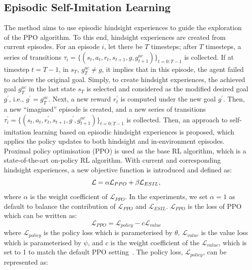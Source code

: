 \subsection{Episodic Self-Imitation Learning}
The method aims to use episodic hindsight experiences to guide the exploration of the PPO algorithm. To this end, hindsight experiences are created from current episodes. For an episode $i$, let there be $T$ timesteps; after $T$ timesteps, a series of transitions $\tau_i =\{ (s_{t}, a_{t}, r_{t}, s_{t+1}, g, g^{ac}_{t+1})\}_{t=0:T-1}$ is collected. If at timestep $t=T-1$, in $s_{T}$, $g^{ac}_{T} \neq g$, it implies that in this episode, the agent failed to achieve the original goal. Simply, to create hindsight experiences, {the achieved goal $g^{ac}_{T}$ in the last state $s_{T}$ is selected and considered as the modified desired goal $g^{\prime}$, i.e., $g^\prime = g^{ac}_{T}$.} Next, a new reward $r_{t}^{\prime}$ is computed under the new goal $g^\prime$. Then, {a new ``imagined'' episode is created}, and a new series of transitions $\tau_i^{\prime} = \{(s_{t}, a_{t}, r_{t}^{\prime},s_{t+1}, g^\prime, g^{ac}_{t+1})\}_{t=0:T-1}$ is collected.
Then, an approach to self-imitation learning based on episodic hindsight experiences is proposed, which applies the policy updates to both hindsight and in-environment episodes. Proximal policy optimisation (PPO) is used as the base RL algorithm, which is a state-of-the-art on-policy RL algorithm. With current and corresponding hindsight experiences, a new objective function is introduced and defined as:
\begin{equation}
  \centering
  \mathcal{L} = \alpha\mathcal{L}_{PPO} + \beta\mathcal{L}_{ESIL},
  \label{eq:loss}
\end{equation}
where $\alpha$ is the weight coefficient of $\mathcal{L}_{PPO}$. In the experiments, we set $\alpha=1$ as default {to balance the contribution of $\mathcal{L}_{PPO}$ and $\mathcal{L}_{ESIL}$}. $\mathcal{L}_{PPO}$ is the loss of PPO which can be written as:
\begin{equation}
  \mathcal{L}_{PPO} = \mathcal{L}_{policy} - c\mathcal{L}_{value}
  \label{eq:ppo_loss}
\end{equation}
where $\mathcal{L}_{policy}$ is the policy loss which is parameterised by $\theta$, $\mathcal{L}_{value}$ is the value loss which is parameterised by $\psi$, and $c$ is the weight coefficient of the $\mathcal{L}_{value}$, which is set to 1 to match the default PPO setting~\cite{schulman2017proximal}. The policy loss, $\mathcal{L}_{policy}$, can be represented as:
